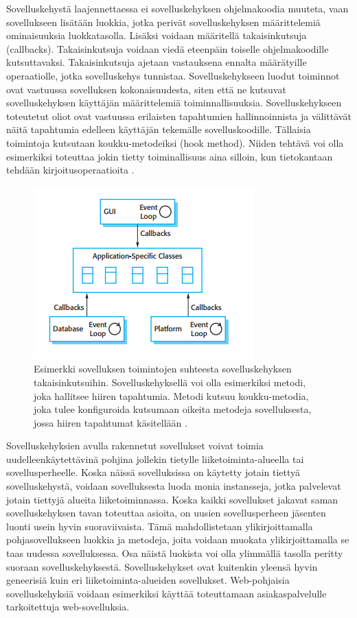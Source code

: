 \documentclass[utf8]{gradu3}
\begin{document}
Sovelluskehystä laajennettaessa ei sovelluskehyksen ohjelmakoodia muuteta, vaan sovellukseen lisätään luokkia, jotka perivät sovelluskehyksen määrittelemiä ominaisuuksia luokkatasolla. Lisäksi voidaan määritellä takaisinkutsuja (callbacks). Takaisinkutsuja voidaan viedä eteenpäin toiselle ohjelmakoodille kutsuttavaksi. Takaisinkutsuja ajetaan vastauksena ennalta määrätyille operaatiolle, jotka sovelluskehys tunnistaa. Sovelluskehykseen luodut toiminnot ovat vastuussa sovelluksen kokonaisuudesta, siten että ne kutsuvat sovelluskehyksen käyttäjän määrittelemiä toiminnallisuuksia. Sovelluskehykseen toteutetut oliot ovat vastuussa erilaisten tapahtumien hallinnoinnista ja välittävät näitä tapahtumia edelleen käyttäjän tekemälle sovelluskoodille. Tällaisia toimintoja kutsutaan koukku-metodeiksi (hook method). Niiden tehtävä voi olla esimerkiksi toteuttaa jokin tietty toiminallisuus aina silloin, kun tietokantaan tehdään kirjoitusoperaatioita \parencite[s. 433]{Sommerville}. 


\begin{figure}[h]
\centering
\includegraphics[scale=0.85]{frameworks.png}
\caption{Esimerkki sovelluksen toimintojen suhteesta sovelluskehyksen takaisinkutsuihin. Sovelluskehyksellä voi olla esimerkiksi metodi, joka hallitsee hiiren tapahtumia. Metodi kutsuu koukku-metodia, joka tulee konfiguroida kutsumaan oikeita metodeja sovelluksesta, jossa hiiren tapahtumat käsitellään \parencite[s.434]{Sommerville}.}
\end{figure}

Sovelluskehyksien avulla rakennetut sovellukset voivat toimia uudelleenkäytettävinä pohjina jollekin tietylle liiketoiminta-alueella tai sovellusperheelle. Koska näissä sovelluksissa on käytetty jotain tiettyä sovelluskehystä, voidaan sovelluksesta luoda monia instansseja, jotka palvelevat jotain tiettyjä alueita liiketoiminnassa. Koska kaikki sovellukset jakavat saman sovelluskehyksen tavan toteuttaa asioita, on uusien sovellusperheen jäsenten luonti usein hyvin suoraviivaista. Tämä mahdollistetaan ylikirjoittamalla pohjasovellukseen luokkia ja metodeja, joita voidaan muokata ylikirjoittamalla se taas uudessa sovelluksessa. Osa näistä luokista voi olla ylimmällä tasolla peritty suoraan sovelluskehyksestä. Sovelluskehykset ovat kuitenkin yleensä hyvin geneerisiä kuin eri
liiketoiminta-alueiden sovellukset. Web-pohjaisia sovelluskehyksiä voidaan esimerkiksi käyttää toteuttamaan asiakaspalvelulle tarkoitettuja web-sovelluksia. 
\end{document}
